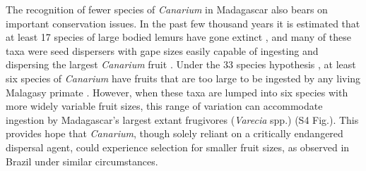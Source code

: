 \documentclass[10pt,letterpaper]{article}
\begin{document}
The recognition of fewer species of \emph{Canarium} in Madagascar also bears on important conservation issues. In the past few thousand years it is estimated that at least 17 species of large bodied lemurs have gone extinct \cite{godfrey_extinct_2003}, and many of these taxa were seed dispersers with gape sizes easily capable of ingesting and dispersing the largest \emph{Canarium} fruit \cite{godfrey_extinct_2003,federman_implications_2016}. Under the 33 species hypothesis \cite{daly_revision_2015}, at least six species of \emph{Canarium} have fruits that are too large to be ingested by any living Malagasy primate \cite{federman_implications_2016}. However, when these taxa are lumped into six species with more widely variable fruit sizes, this range of variation can accommodate ingestion by Madagascar’s largest extant frugivores (\emph{Varecia} spp.) (S4 Fig.). %
This provides hope that \emph{Canarium}, though solely reliant on a critically endangered dispersal agent, could experience selection for smaller fruit sizes, as \cite{galetti_functional_2013} observed in Brazil under similar circumstances. 
\end{document}
